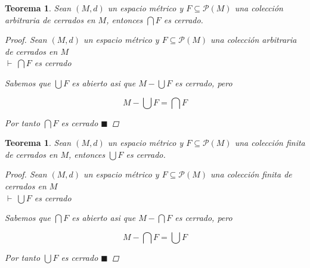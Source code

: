\documentclass[oneside]{book} %
\theoremstyle{Teorema}
\newtheorem{Teorema}[Definicion]{Teorema}
\theoremstyle{Ejemplos}
\theoremstyle{[Obs]}
\renewcommand{\{}{\left\lbrace} %
\renewcommand{\}}{\right\rbrace} %
\newcommand{\U}{\bigcup} %
\newcommand{\N}{\bigcap} %
\renewcommand{\sc}{\subseteq} %
\renewcommand{\P}{\mathcal{P}} %
\renewcommand{\qed}{$\blacksquare$} %
\newcommand{\pd}{$\vdash\ $} %
\begin{document}
			\begin{Teorema}\setlength{\parindent}{0em}
			
				Sean $(M, d)$ un espacio métrico y $F \sc \P(M)$ una colección arbitraria de cerrados en $M$, entonces $\N F$ es cerrado. 

				\begin{proof}
					
					Sean $(M, d)$ un espacio métrico y $F \sc \P(M)$ una colección arbitraria de cerrados en $M$ \\ 
					\pd $\N F$ es cerrado

					Sabemos que $\U F$ es abierto asi que $M - \U F$ es cerrado, pero 

					\[ M - \U F = \N F \]

					Por tanto $\N F$ es cerrado \qed

				\end{proof}
			
			\end{Teorema}

			\begin{Teorema}\setlength{\parindent}{0em}
			
				Sean $(M, d)$ un espacio métrico y $F \sc \P(M)$ una colección finita de cerrados en $M$, entonces $\U F$ es cerrado. 

				\begin{proof}
					
					Sean $(M, d)$ un espacio métrico y $F \sc \P(M)$ una colección finita de cerrados en $M$ \\ 
					\pd $\U F$ es cerrado

					Sabemos que $\N F$ es abierto asi que $M - \N F$ es cerrado, pero 

					\[ M - \N F = \U F \]

					Por tanto $\U F$ es cerrado \qed

				\end{proof}
			
			\end{Teorema}
\end{document}
